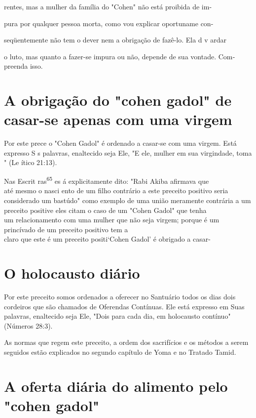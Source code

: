 \begin{itemize}
\begin{enumrate}
\begin{itemize}
\begin{itemize}
rentes, mas a mulher da família do "Cohen" não está proibida de im-

pura por qualquer pessoa morta, como vou explicar oportuname con-

seqüentemente não tem o dever nem a obrigação de fazê-lo. Ela d v ardar

o luto, mas quanto a fazer-se impura ou não, depende de sua vontade.
Com­preenda isso.

\section{A obrigação do "cohen gadol" de casar-se apenas com uma virgem}

Por este prece o "Cohen Gadol" é ordenado a casar-se com uma virgem.
Está expresso S s palavras, enaltecido seja Ele, "E ele, mulher em sua
virgindade, toma " (Le ítico 21:13).


Nas Escrit ras\textsuperscript{65} es á explicitamente dito: "Rabi Akiba
afirmava que\\
até mesmo o nasci ento de um filho contrário a este preceito positivo
seria\\
considerado um bastúdo" como exemplo de uma união meramente contrária
a um preceito positive eles citam o caso de um "Cohen Gadol" que
tenha\\
um relacionamento com uma mulher que não seja virgem; porque é um
princívado
de um preceito positivo tem a\\
claro que este é um preceito positi`Cohen
Gadol' é obrigado a casar-


\section{O holocausto diário}

Por este preceito somos ordenados a oferecer no Santuário todos os dias
dois cordeiros que são chamados de Oferendas Contínuas. Ele está
ex­presso em Suas palavras, enaltecido seja Ele, "Dois para cada dia, em
holocaus­to contínuo" (Números 28:3).

As normas que regem este preceito, a ordem dos sacrifícios e os mé­todos
a serem seguidos estão explicados no segundo capítulo de Yoma e no
Tratado Tamid.

\section{A oferta diária do alimento pelo "cohen gadol"}


\end{itemize}
\end{itemize}
\end{enumrate}
\end{itemize}

